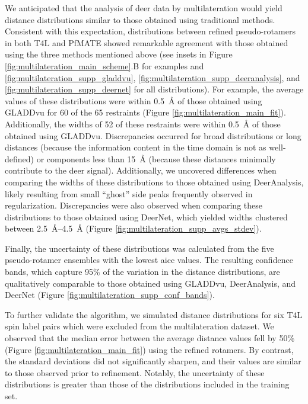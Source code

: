 We anticipated that the analysis of \gls{deer} data by multilateration would yield distance distributions similar to those obtained using traditional methods. Consistent with this expectation, distributions between refined pseudo-rotamers in both T4L and PfMATE showed remarkable agreement with those obtained using the three methods mentioned above (see insets in Figure \ref{fig:multilateration_main_scheme}.B for examples and  \ref{fig:multilateration_supp_gladdvu}, \ref{fig:multilateration_supp_deeranalysis}, and \ref{fig:multilateration_supp_deernet} for all distributions). For example, the average values of these distributions were within \SI{0.5}{\angstrom} of those obtained using GLADDvu for 60 of the 65 restraints (Figure \ref{fig:multilateration_main_fit}). Additionally, the widths of 52 of these restraints were within \SI{0.5}{\angstrom} of those obtained using GLADDvu. Discrepancies occurred for broad distributions or long distances (because the information content in the time domain is not as well-defined) or components less than \SI{15}{\angstrom} (because these distances minimally contribute to the \gls{deer} signal). Additionally, we uncovered differences when comparing the widths of these distributions to those obtained using DeerAnalysis, likely resulting from small “ghost” side peaks frequently observed in regularization. Discrepancies were also observed when comparing these distributions to those obtained using DeerNet, which yielded widths clustered between \SIrange{2.5}{4.5}{\angstrom} (Figure \ref{fig:multilateration_supp_avgs_stdev}).

Finally, the uncertainty of these distributions was calculated from the five pseudo-rotamer ensembles with the lowest \gls{aicc} values. The resulting confidence bands, which capture 95\% of the variation in the distance distributions, are qualitatively comparable to those obtained using GLADDvu, DeerAnalysis, and DeerNet (Figure \ref{fig:multilateration_supp_conf_bands}).

To further validate the algorithm, we simulated distance distributions for six T4L spin label pairs which were excluded from the multilateration dataset. We observed that the median error between the average distance values fell by 50\% (Figure \ref{fig:multilateration_main_fit}) using the refined rotamers. By contrast, the standard deviations did not significantly sharpen, and their values are similar to those observed prior to refinement. Notably, the uncertainty of these distributions is greater than those of the distributions included in the training set.

